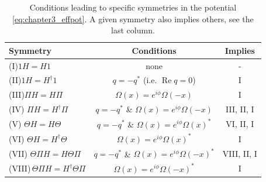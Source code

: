 \begin{table}[t]
  \caption{Conditions leading to  specific symmetries in the potential \eqref{eq:chapter3_effpot}. A given symmetry also implies others, see the last column.\label{tab:chapter3_SymmetriesConditions}}
  \hspace*{-0.1cm}
  \centering
  \begin{tabular}{lcc}
  \hline\hline
  Symmetry& Conditions & Implies
  \\
  \hline
  (I)\;$1H=H1$ &   none & -
  \\
  (II)\;$1H=H^\dagger 1$ &  $q=-q^{*}$ (i.e. $\operatorname{Re}q=0$) & I
  \\
  (III)\;$ \Pi H=H\Pi$ &  $\Omega(x)=e^{i\phi}\Omega(-x)$ & I
  \\
  (IV) $\Pi H=H^\dagger \Pi$ &  $q=-q^{*}$ \& $\Omega(x)=e^{i\phi}\Omega(-x)$ & III,\! II,\! I
  \\
  (V) $\Theta H=H\Theta$ &  $q=-q^{*}$ \& $\Omega(x)=e^{i\phi}\Omega(x)^*$ & {\small VI,\! II,\! I}
  \\
  (VI) $\Theta H=H^\dagger\Theta$ &  $\Omega(x)=e^{i\phi}\Omega(x)^*$ & I
  \\
  (VII) $\Theta\Pi H=H\Theta \Pi$ &  $q=-q^{*}$ \& $\Omega(x)=e^{i\phi}\Omega(-x)^*$ & VIII,\! II,\! I
  \\
  (VIII)\,$\Theta\Pi H=H^\dagger \Theta \Pi$ &  $\Omega(x)=e^{i\phi}\Omega(-x)^*$  & I
  \\
  \hline\hline
  \end{tabular}
\end{table}

%
